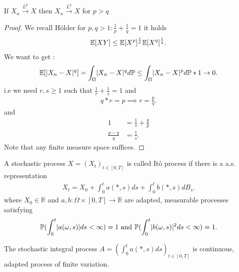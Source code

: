 \begin{Lemma}
  If $ X_n \xrightarrow{L^p} X$ then $X_n \xrightarrow{L^q} X$ for $p>q$
\end{Lemma}
\begin{proof}
 We recall Hölder for $p,q>1 : \frac{1}{p}+\frac{1}{q} = 1$ it holds
 \begin{align*}
   \mathbb{E}[XY] \le \mathbb{E}[X^{p} ]^{\frac{1}{p}} \mathbb{E}[X^{q} ]^{\frac{1}{q}} 
 .\end{align*}
 We want to get :
 \begin{align*}
   \mathbb{E}[\lvert X_n-X\rvert^{q}] = \int_{\Omega } \lvert X_n-X\rvert^{q} d\mathbb{P}  \le  \int_{\Omega } \lvert X_n-X\rvert^{p} d\mathbb{P} * 1 \to 0
 .\end{align*}
 i.e we need $r,s\ge 1$ such that $\frac{1}{r}+\frac{1}{s} = 1$ and 
 \begin{align*}
  q*r = p \implies r = \frac{p}{q}
 .\end{align*}
 and 
 \begin{align*}
   1&=\frac{1}{s}+\frac{q}{p} \\
   \frac{p-q}{q} &= \frac{1}{s}
 .\end{align*}
 Note that any finite measure space suffices.
\end{proof}
\begin{Definition}[4.1]
  A stochastic process $X = (X_t)_{t \in  [0,T]}$  is called It\^o process if there is a a.s. 
  representation
  \begin{align*}
    X_t = X_{0} + \int_0^{t} a(*,s) ds + \int_0^{t} b(*,s) dB_s  
  .\end{align*}
  where $X_{0} \in  \mathbb{R}$ and $a,b : \Omega \times [0,T] \to \mathbb{R}$ are adapted, measurable processes satisfying 
  \begin{align*}
    \mathbb{P}(\int_0^{t} \lvert a(\omega ,s)\rvert ds  <\infty) = 1 \text{ and }  \mathbb{P}(\int_0^{t} \lvert b(\omega ,s)\rvert^2 ds  <\infty) = 1
  .\end{align*}
\end{Definition}
\begin{remark}
  The stochastic integral process $A = (\int_0^{t} a(*,s) ds )_{t \in [0,T]}$  is continuous, adapted process of finite variation.
\end{remark}
